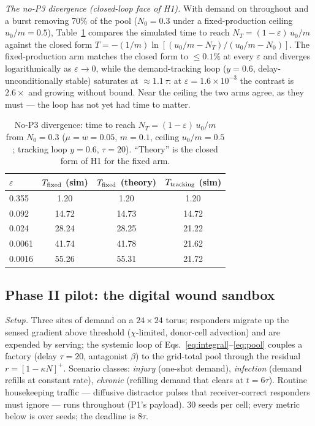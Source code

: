 \documentclass[twoside,twocolumn,usenatbib]{mnras}
\begin{document}
\emph{The no-P3 divergence (closed-loop face of H1).}  With demand on
throughout and a burst removing 70\% of the pool ($N_0 = 0.3$ under a
fixed-production ceiling $u_0/m = 0.5$), Table~\ref{tab:nop3} compares
the simulated time to reach $N_T = (1-\varepsilon)\,u_0/m$ against
the closed form $T = -(1/m)\ln[(u_0/m - N_T)/(u_0/m - N_0)]$.  The
fixed-production arm matches the closed form to $\le 0.1\%$ at every
$\varepsilon$ and diverges logarithmically as $\varepsilon
\rightarrow 0$, while the demand-tracking loop ($y = 0.6$,
delay-unconditionally stable) saturates at $\approx 1.1\,\tau$: at
$\varepsilon = 1.6\times10^{-3}$ the contrast is $2.6\times$ and
growing without bound.  Near the ceiling the two arms agree, as they
must --- the loop has not yet had time to matter.

\begin{table}
\centering
\caption{No-P3 divergence: time to reach $N_T = (1-\varepsilon)\,
u_0/m$ from $N_0 = 0.3$ ($\mu = w = 0.05$, $m = 0.1$, ceiling
$u_0/m = 0.5$; tracking loop $y = 0.6$, $\tau = 20$).  ``Theory'' is
the closed form of H1 for the fixed arm.}
\label{tab:nop3}
\begin{tabular}{lccc}
\toprule
$\varepsilon$ & $T_{\rm fixed}$ (sim) & $T_{\rm fixed}$ (theory) &
$T_{\rm tracking}$ (sim) \\
\midrule
0.355 & 1.20 & 1.20 & 1.20 \\
0.092 & 14.72 & 14.73 & 14.72 \\
0.024 & 28.24 & 28.25 & 21.22 \\
0.0061 & 41.74 & 41.78 & 21.62 \\
0.0016 & 55.26 & 55.31 & 21.72 \\
\bottomrule
\end{tabular}
\end{table}

\subsection{Phase II pilot: the digital wound sandbox}
\label{app:pilot-2}

\emph{Setup.}  Three sites of demand on a $24\times24$ torus;
responders migrate up the sensed gradient above threshold
($\chi$-limited, donor-cell advection) and are expended by serving;
the systemic loop of Eqs.~\ref{eq:integral}--\ref{eq:pool} couples a
factory (delay $\tau = 20$, antagonist $\beta$) to the grid-total
pool through the residual $r = [1 - \kappa N]^+$.  Scenario classes:
\emph{injury} (one-shot demand), \emph{infection} (demand refills at
constant rate), \emph{chronic} (refilling demand that clears at
$t = 6\tau$).  Routine housekeeping traffic --- diffusive distractor
pulses that receiver-correct responders must ignore --- runs
throughout (P1's payload).  30 seeds per cell; every metric below is
over seeds; the deadline is $8\tau$.
\end{document}
